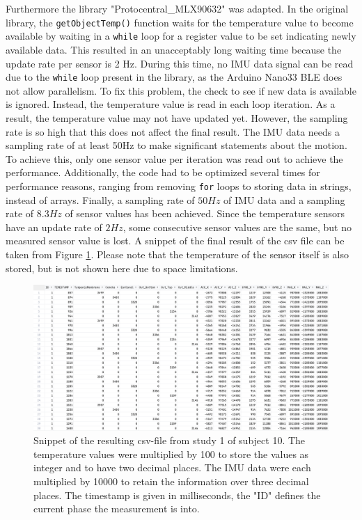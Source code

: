 Furthermore the library "Protocentral\_MLX90632" was adapted. In the original library, the \texttt{getObjectTemp()} function waits for the temperature value to become available by waiting in a \texttt{while} loop for a register value to be set indicating newly available data. This resulted in an unacceptably long waiting time because the update rate per sensor is 2 Hz. 
During this time, no IMU data signal can be read due to the \texttt{while} loop present in the library, as the Arduino Nano33 BLE does not allow parallelism. 
To fix this problem, the check to see if new data is available is ignored. 
Instead, the temperature value is read in each loop iteration. 
As a result, the temperature value may not have updated yet. 
However, the sampling rate is so high that this does not affect the final result.
The IMU data needs a sampling rate of at least 50Hz to make significant statements about the motion. 
To achieve this, only one sensor value per iteration was read out to achieve the performance. 
Additionally, the code had to be optimized several times for performance reasons, ranging from removing \texttt{for} loops to storing data in strings, instead of arrays. 
Finally, a sampling rate of $50Hz$ of IMU data and a sampling rate of $8.3Hz$ of sensor values has been achieved.
Since the temperature sensors have an update rate of $2Hz$, some consecutive sensor values are the same, but no measured sensor value is lost.
A snippet of the final result of the csv file can be taken from Figure \ref{fig:implementation:raw_csv_content_snippet}. Please note that the temperature of the sensor itself is also stored, but is not shown here due to space limitations.

\begin{figure}[!t]
    \centering
    \includegraphics[width=\textwidth]{thesis-doc/images/prototype/MeasurementRawDataSnippet.png}
    \caption{Snippet of the resulting csv-file from study 1 of subject 10. The temperature values were multiplied by 100 to store the values as integer and to have two decimal places. The IMU data were each multiplied by 10000 to retain the information over three decimal places. The timestamp is given in milliseconds, the "ID" defines the current phase the measurement is into.}    
    \label{fig:implementation:raw_csv_content_snippet}
\end{figure} 

